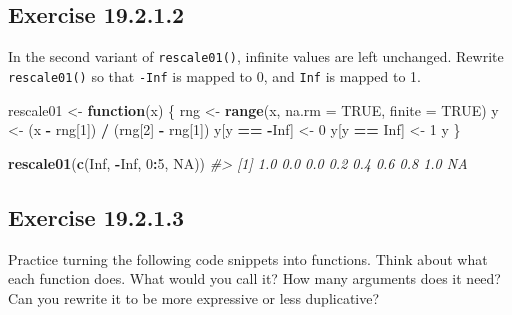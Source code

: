 \documentclass[]{book}
\newenvironment{Shaded}{\begin{snugshade}}{\end{snugshade}}
\newcommand{\CommentTok}[1]{\textcolor[rgb]{0.56,0.35,0.01}{\textit{#1}}}
\newcommand{\ControlFlowTok}[1]{\textcolor[rgb]{0.13,0.29,0.53}{\textbf{#1}}}
\newcommand{\DataTypeTok}[1]{\textcolor[rgb]{0.13,0.29,0.53}{#1}}
\newcommand{\DecValTok}[1]{\textcolor[rgb]{0.00,0.00,0.81}{#1}}
\newcommand{\KeywordTok}[1]{\textcolor[rgb]{0.13,0.29,0.53}{\textbf{#1}}}
\newcommand{\NormalTok}[1]{#1}
\newcommand{\OperatorTok}[1]{\textcolor[rgb]{0.81,0.36,0.00}{\textbf{#1}}}
\newcommand{\OtherTok}[1]{\textcolor[rgb]{0.56,0.35,0.01}{#1}}
\newcommand{\StringTok}[1]{\textcolor[rgb]{0.31,0.60,0.02}{#1}}
\theoremstyle{plain}
\theoremstyle{remark}
\begin{document}
\hypertarget{exercise-19.2.1.2}{%
\subsection*{\texorpdfstring{Exercise {19.2.1.2}}{Exercise 19.2.1.2}}\label{exercise-19.2.1.2}}

In the second variant of \texttt{rescale01()}, infinite values are left unchanged.
Rewrite \texttt{rescale01()} so that \texttt{-Inf} is mapped to 0, and \texttt{Inf} is mapped to 1.

\begin{Shaded}
\begin{Highlighting}[]
\NormalTok{rescale01 <-}\StringTok{ }\ControlFlowTok{function}\NormalTok{(x) \{}
\NormalTok{  rng <-}\StringTok{ }\KeywordTok{range}\NormalTok{(x, }\DataTypeTok{na.rm =} \OtherTok{TRUE}\NormalTok{, }\DataTypeTok{finite =} \OtherTok{TRUE}\NormalTok{)}
\NormalTok{  y <-}\StringTok{ }\NormalTok{(x }\OperatorTok{-}\StringTok{ }\NormalTok{rng[}\DecValTok{1}\NormalTok{]) }\OperatorTok{/}\StringTok{ }\NormalTok{(rng[}\DecValTok{2}\NormalTok{] }\OperatorTok{-}\StringTok{ }\NormalTok{rng[}\DecValTok{1}\NormalTok{])}
\NormalTok{  y[y }\OperatorTok{==}\StringTok{ }\OperatorTok{-}\OtherTok{Inf}\NormalTok{] <-}\StringTok{ }\DecValTok{0}
\NormalTok{  y[y }\OperatorTok{==}\StringTok{ }\OtherTok{Inf}\NormalTok{] <-}\StringTok{ }\DecValTok{1}
\NormalTok{  y}
\NormalTok{\}}

\KeywordTok{rescale01}\NormalTok{(}\KeywordTok{c}\NormalTok{(}\OtherTok{Inf}\NormalTok{, }\OperatorTok{-}\OtherTok{Inf}\NormalTok{, }\DecValTok{0}\OperatorTok{:}\DecValTok{5}\NormalTok{, }\OtherTok{NA}\NormalTok{))}
\CommentTok{#> [1] 1.0 0.0 0.0 0.2 0.4 0.6 0.8 1.0  NA}
\end{Highlighting}
\end{Shaded}

\hypertarget{exercise-19.2.1.3}{%
\subsection*{\texorpdfstring{Exercise {19.2.1.3}}{Exercise 19.2.1.3}}\label{exercise-19.2.1.3}}

Practice turning the following code snippets into functions. Think about what each function does. What would you call it? How many arguments does it need? Can you rewrite it to be more expressive or less duplicative?
\end{document}
